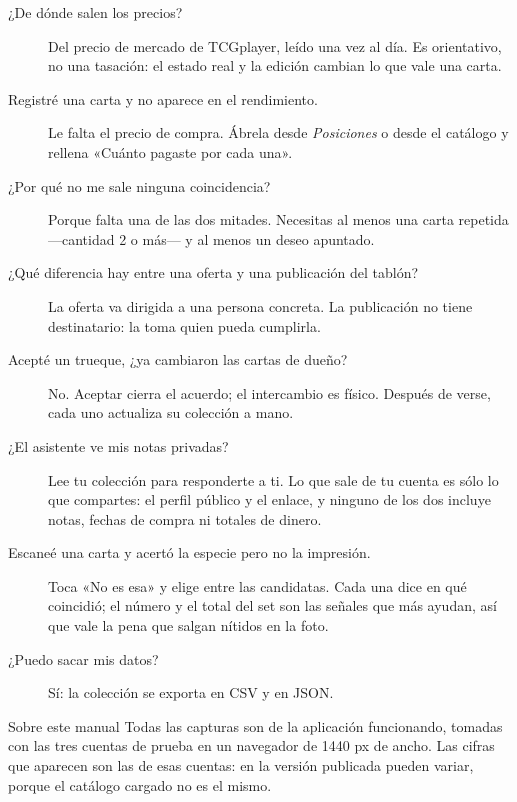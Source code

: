 \documentclass[11pt,a4paper]{article}
\begin{document}
\begin{description}
  \item[¿De dónde salen los precios?]
  Del precio de mercado de TCGplayer, leído una vez al día. Es orientativo, no
  una tasación: el estado real y la edición cambian lo que vale una carta.

  \item[Registré una carta y no aparece en el rendimiento.]
  Le falta el precio de compra. Ábrela desde \emph{Posiciones} o desde el
  catálogo y rellena «Cuánto pagaste por cada una».

  \item[¿Por qué no me sale ninguna coincidencia?]
  Porque falta una de las dos mitades. Necesitas al menos una carta repetida
  ---cantidad 2 o más--- y al menos un deseo apuntado.

  \item[¿Qué diferencia hay entre una oferta y una publicación del tablón?]
  La oferta va dirigida a una persona concreta. La publicación no tiene
  destinatario: la toma quien pueda cumplirla.

  \item[Acepté un trueque, ¿ya cambiaron las cartas de dueño?]
  No. Aceptar cierra el acuerdo; el intercambio es físico. Después de verse,
  cada uno actualiza su colección a mano.

  \item[¿El asistente ve mis notas privadas?]
  Lee tu colección para responderte a ti. Lo que sale de tu cuenta es sólo lo
  que compartes: el perfil público y el enlace, y ninguno de los dos incluye
  notas, fechas de compra ni totales de dinero.

  \item[Escaneé una carta y acertó la especie pero no la impresión.]
  Toca «No es esa» y elige entre las candidatas. Cada una dice en qué coincidió;
  el número y el total del set son las señales que más ayudan, así que vale la
  pena que salgan nítidos en la foto.

  \item[¿Puedo sacar mis datos?]
  Sí: la colección se exporta en CSV y en JSON.
\end{description}

\vfill

\begin{notabox}{Sobre este manual}
Todas las capturas son de la aplicación funcionando, tomadas con las tres
cuentas de prueba en un navegador de 1440 px de ancho. Las cifras que aparecen son las de esas
cuentas: en la versión publicada pueden variar, porque el catálogo cargado no es
el mismo.
\end{notabox}
\end{document}

